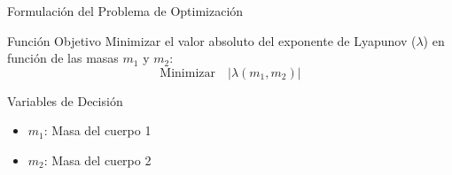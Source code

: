 
\begin{frame}{Formulación del Problema de Optimización}

\begin{block}{Función Objetivo}
  Minimizar el valor absoluto del exponente de Lyapunov ($\lambda$) en función de las masas $m_1$ y $m_2$:
  $$ \text{Minimizar} \quad |\lambda(m_1, m_2)| $$ %
\end{block}

\begin{block}{Variables de Decisión}
  \begin{itemize}
      \item $m_1$: Masa del cuerpo 1
      \item $m_2$: Masa del cuerpo 2
  \end{itemize}
\end{block}
\end{frame}

